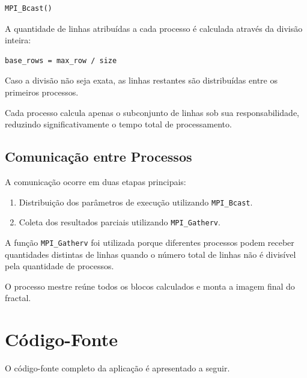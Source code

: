 \documentclass[
    12pt,
    oneside,
    a4paper,
    brazil
]{abntex2}
\begin{document}
\begin{verbatim}
MPI_Bcast()
\end{verbatim}

A quantidade de linhas atribuídas a cada processo é calculada através da divisão inteira:

\begin{verbatim}
base_rows = max_row / size
\end{verbatim}

Caso a divisão não seja exata, as linhas restantes são distribuídas entre os primeiros processos.

Cada processo calcula apenas o subconjunto de linhas sob sua responsabilidade, reduzindo significativamente o tempo total de processamento.

\section{Comunicação entre Processos}

A comunicação ocorre em duas etapas principais:

\begin{enumerate}
    \item Distribuição dos parâmetros de execução utilizando
    \texttt{MPI\_Bcast}.
    
    \item Coleta dos resultados parciais utilizando
    \texttt{MPI\_Gatherv}.
\end{enumerate}

A função \texttt{MPI\_Gatherv} foi utilizada porque diferentes processos podem receber quantidades distintas de linhas quando o número total de linhas não é divisível pela quantidade de processos.

O processo mestre reúne todos os blocos calculados e monta a imagem final do fractal.

\chapter{Código-Fonte}

O código-fonte completo da aplicação é apresentado a seguir.

\small
\end{document}

